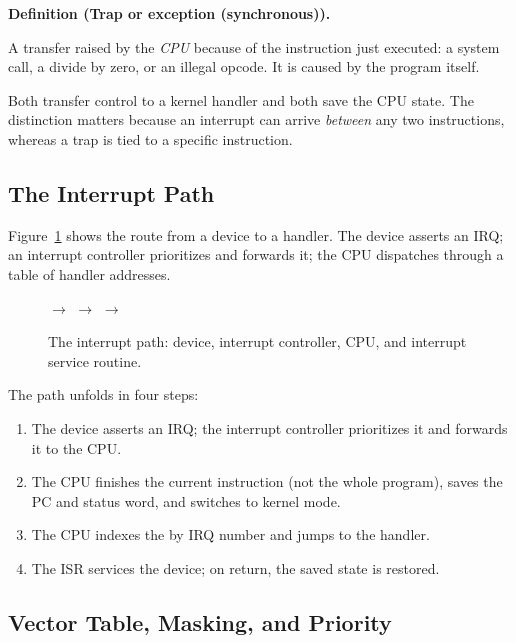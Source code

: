 \documentclass[11pt]{article}
\newenvironment{definitionbox}[1]{%
  \par\noindent\textbf{Definition (#1).}\ \itshape
}{\par\vspace{0.3em}}
\begin{document}
\begin{definitionbox}{Trap or exception (synchronous)}
A transfer raised by the \emph{CPU} because of the instruction just executed: a system call, a divide by zero, or an illegal opcode. It is caused by the program itself.
\end{definitionbox}

Both transfer control to a kernel handler and both save the CPU state. The distinction matters because an interrupt can arrive \emph{between} any two instructions, whereas a trap is tied to a specific instruction.

\subsection{The Interrupt Path}

Figure~\ref{fig:interrupt-path} shows the route from a device to a handler. The device asserts an IRQ; an interrupt controller prioritizes and forwards it; the CPU dispatches through a table of handler addresses.

\begin{figure}[ht]
\centering
\small
{} $\longrightarrow$  $\longrightarrow$
 $\longrightarrow$ \\[0.4em]
\caption{The interrupt path: device, interrupt controller, CPU, and interrupt service routine.}
\label{fig:interrupt-path}
\end{figure}

The path unfolds in four steps:

\begin{enumerate}
  \item The device asserts an IRQ; the interrupt controller prioritizes it and forwards it to the CPU.
  \item The CPU finishes the current instruction (not the whole program), saves the PC and status word, and switches to kernel mode.
  \item The CPU indexes the  by IRQ number and jumps to the handler.
  \item The ISR services the device; on return, the saved state is restored.
\end{enumerate}

\subsection{Vector Table, Masking, and Priority}
\end{document}

